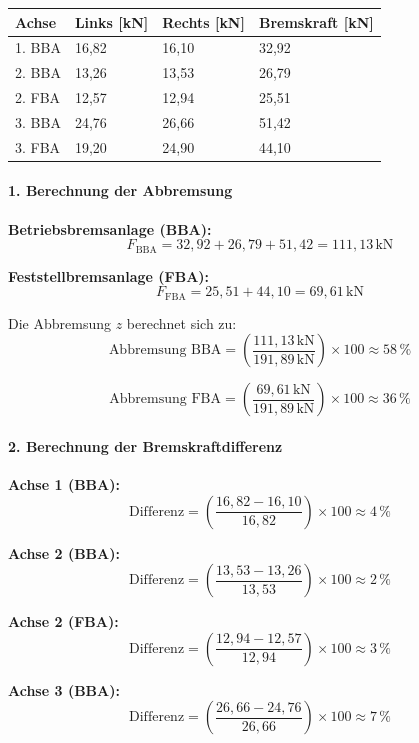 \documentclass{vorlage-design-main}
\begin{document}
\begin{table}[ht]
  \begin{tabular}{@{}llll@{}}
  \toprule

Achse & Links {[}kN{]} & Rechts {[}kN{]} & Bremskraft {[}kN{]} \\
\midrule[\heavyrulewidth]
1. BBA & 16,82 & 16,10 & 32,92 \\
2. BBA & 13,26 & 13,53 & 26,79 \\
2. FBA & 12,57 & 12,94 & 25,51 \\
3. BBA & 24,76 & 26,66 & 51,42 \\
3. FBA & 19,20 & 24,90 & 44,10 \\
  \bottomrule
  \end{tabular}%
\end{table}

\paragraph{1. Berechnung der
Abbremsung}\label{berechnung-der-abbremsung}

\textbf{Betriebsbremsanlage (BBA):}
\[F_{\text{BBA}} = 32,92 + 26,79 + 51,42 = 111,13 \, \text{kN}\]

\textbf{Feststellbremsanlage (FBA):}
\[F_{\text{FBA}} = 25,51 + 44,10 = 69,61 \, \text{kN}\]

Die Abbremsung $z$ berechnet sich zu:
\[\text{Abbremsung BBA} = \left( \frac{111,13 \, \text{kN}}{191,89 \, \text{kN}} \right) \times 100 \approx 58 \, \%\]

\[\text{Abbremsung FBA} = \left( \frac{69,61 \, \text{kN}}{191,89 \, \text{kN}} \right) \times 100 \approx 36 \, \%\]

\paragraph{2. Berechnung der
Bremskraftdifferenz}\label{berechnung-der-bremskraftdifferenz}

\textbf{Achse 1 (BBA):}
\[\text{Differenz} = \left( \frac{16,82 - 16,10}{16,82} \right) \times 100 \approx 4 \, \%\]

\textbf{Achse 2 (BBA):}
\[\text{Differenz} = \left( \frac{13,53 - 13,26}{13,53} \right) \times 100 \approx 2 \, \%\]

\textbf{Achse 2 (FBA):}
\[\text{Differenz} = \left( \frac{12,94 - 12,57}{12,94} \right) \times 100 \approx 3 \, \%\]

\textbf{Achse 3 (BBA):}
\[\text{Differenz} = \left( \frac{26,66 - 24,76}{26,66} \right) \times 100 \approx 7 \, \%\]
\end{document}
